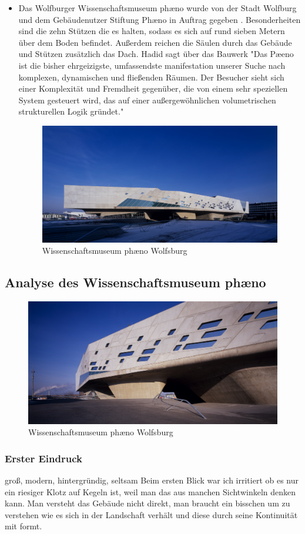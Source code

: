 \documentclass[a4paper]{article}
\begin{document}
\begin{itemize}
\item Das Wolfburger Wissenschaftsmuseum phæno wurde von der Stadt Wolfburg und
	dem Gebäudenutzer Stiftung Phæno in Auftrag gegeben \cite[S.
	37]{taschen_zaha_hadid}. Besonderheiten sind die zehn Stützen die es halten,
	sodass es sich auf rund sieben Metern über dem Boden befindet. Außerdem
	reichen die Säulen durch das Gebäude und Stützen zusätzlich das Dach. Hadid
	sagt über das Bauwerk "Das Pæeno ist die bisher ehrgeizigste, umfassendste
	manifestation unserer Suche nach komplexen, dynamischen und fließenden Räumen.
	Der Besucher sieht sich einer Komplexität und Fremdheit gegenüber, die von
	einem sehr speziellen System gesteuert wird, das auf einer außergewöhnlichen
	volumetrischen strukturellen Logik gründet."
\begin{figure}[h]
\centering
\includegraphics[width=.5\linewidth]{hadid-architects-phaeno.png}
\caption{Wissenschaftsmuseum phæno Wolfsburg \cite{hadid_phaeno_image}}
\end{figure}
\end{itemize}


\subsection{Analyse des Wissenschaftsmuseum phæno}
\begin{figure}[h]
\centering
\includegraphics[width=\linewidth]{phaeno2.png}
\caption{Wissenschaftsmuseum phæno Wolfsburg \cite{phaeno2}}
\end{figure}
\subsubsection{Erster Eindruck}
groß, modern, hintergründig, seltsam
Beim ersten Blick war ich irritiert ob es nur ein riesiger Klotz auf Kegeln ist,
weil man das aus manchen Sichtwinkeln denken kann. Man versteht das Gebäude
nicht direkt, man braucht ein bisschen um zu verstehen wie es sich in der
Landschaft verhält und diese durch seine Kontinuität mit formt.
\end{document}
